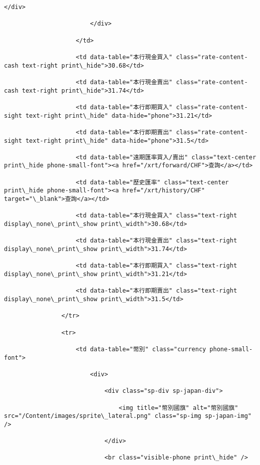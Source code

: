 \documentclass[11pt]{article}
\begin{document}
\begin{Verbatim}[commandchars=\\\{\}]
                            </div>

                        </div>

                    </td>

                    <td data-table="本行現金買入" class="rate-content-cash text-right print\_hide">30.68</td>

                    <td data-table="本行現金賣出" class="rate-content-cash text-right print\_hide">31.74</td>

                    <td data-table="本行即期買入" class="rate-content-sight text-right print\_hide" data-hide="phone">31.21</td>

                    <td data-table="本行即期賣出" class="rate-content-sight text-right print\_hide" data-hide="phone">31.5</td>

                    <td data-table="遠期匯率買入/賣出" class="text-center print\_hide phone-small-font"><a href="/xrt/forward/CHF">查詢</a></td>

                    <td data-table="歷史匯率" class="text-center print\_hide phone-small-font"><a href="/xrt/history/CHF" target="\_blank">查詢</a></td>

                    <td data-table="本行現金買入" class="text-right display\_none\_print\_show print\_width">30.68</td>

                    <td data-table="本行現金賣出" class="text-right display\_none\_print\_show print\_width">31.74</td>

                    <td data-table="本行即期買入" class="text-right display\_none\_print\_show print\_width">31.21</td>

                    <td data-table="本行即期賣出" class="text-right display\_none\_print\_show print\_width">31.5</td>

                </tr>

                <tr>

                    <td data-table="幣別" class="currency phone-small-font">

                        <div>

                            <div class="sp-div sp-japan-div">

                                <img title="幣別國旗" alt="幣別國旗" src="/Content/images/sprite\_lateral.png" class="sp-img sp-japan-img" />

                            </div>

                            <br class="visible-phone print\_hide" />


\end{Verbatim}
\end{document}
